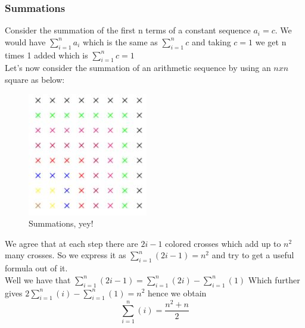 \documentclass[titlepage]{article}
\theoremstyle{definition}
\numberwithin{equation}{subsection}
\numberwithin{remark}{subsection}
\begin{document}
\subsubsection{Summations}
Consider the summation of the first n terms of a constant sequence $a_{i} = c$. We would have $\sum_{i=1}^{n}a_{i}$ which is the same as $\sum_{i=1}^{n}c$ and taking $c=1$ we get n times 1 added which is $\sum_{i=1}^{n}c = 1$
\\
Let's now consider the summation of an arithmetic sequence by using an $nxn$ square as below: 
\begin{figure}[H]
    \centering
    \includegraphics{epflLectureNotes/advancedComputation/figures/square.JPG}
    \caption{Summations, yey!}
\end{figure}

We agree that at each step there are $2i-1$ colored crosses which add up to $n^2$ many crosses. So we express it as $\sum_{i=1}^{n}(2i-1) = n^2$ and try to get a useful formula out of it. 
\\
Well we have that $\sum_{i=1}^{n}(2i-1) = \sum_{i=1}^{n}(2i) - \sum_{i=1}^{n}(1)$ Which further gives $2\sum_{i=1}^{n}(i) - \sum_{i=1}^{n}(1) = n^2$ hence we obtain $$\sum_{i=1}^{n}(i) = \frac{n^2 + n}{2}$$
\end{document}
